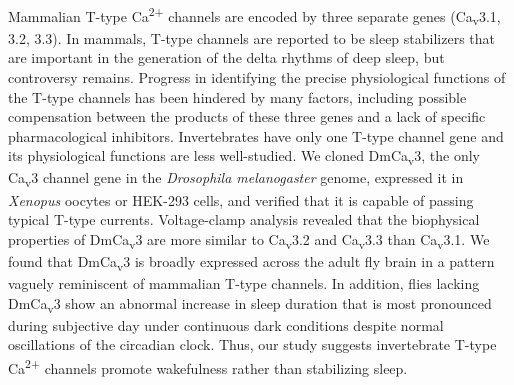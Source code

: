 Mammalian T-type Ca\textsuperscript{2+} channels are encoded by three separate genes (Ca\textsubscript{v}3.1, 3.2, 3.3).
In mammals, T-type channels are reported to be sleep stabilizers that are important in the generation of the delta rhythms of deep sleep, but controversy remains.
Progress in identifying the precise physiological functions of the T-type channels has been hindered by many factors, including possible compensation between the products of these three genes and a lack of specific pharmacological inhibitors.
Invertebrates have only one T-type channel gene and its physiological functions are less well-studied.
We cloned DmCa\textsubscript{v}3, the only Ca\textsubscript{v}3 channel gene in the \emph{Drosophila melanogaster} genome, expressed it in \emph{Xenopus} oocytes or HEK-293 cells, and verified that it is capable of passing typical T-type currents.
Voltage-clamp analysis revealed that the biophysical properties of DmCa\textsubscript{v}3 are more similar to Ca\textsubscript{v}3.2 and Ca\textsubscript{v}3.3 than Ca\textsubscript{v}3.1.
We found that DmCa\textsubscript{v}3 is broadly expressed across the adult fly brain in a pattern vaguely reminiscent of mammalian T-type channels.
In addition, flies lacking DmCa\textsubscript{v}3 show an abnormal increase in sleep duration that is most pronounced during subjective day under continuous dark conditions despite normal oscillations of the circadian clock.
Thus, our study suggests invertebrate T-type Ca\textsuperscript{2+} channels promote wakefulness rather than stabilizing sleep.
